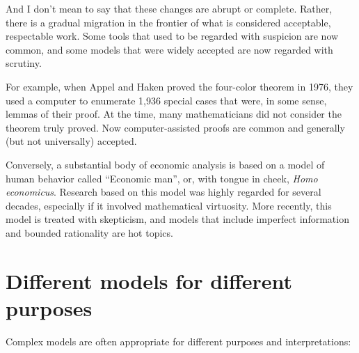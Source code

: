 \documentclass[12pt]{book}
\theoremstyle{exercise}
\begin{document}
And I don't mean to say that these changes are abrupt or complete.
Rather, there is a gradual migration in the frontier of what is
considered acceptable, respectable work.  Some tools that used to be
regarded with suspicion are now common, and some models that were
widely accepted are now regarded with scrutiny.

For example, when Appel and Haken proved the four-color theorem in
1976, they used a computer to enumerate 1,936 special cases that were,
in some sense, lemmas of their proof.  At the time, many
mathematicians did not consider the theorem truly proved.  Now
computer-assisted proofs are common and generally (but not
universally) accepted.


Conversely, a substantial body of economic analysis is based on a
model of human behavior called ``Economic man'', or, with tongue in
cheek, {\it Homo economicus}.  Research based on this model was
highly regarded for several decades, especially if it involved
mathematical virtuosity.  More recently, this model is treated with
skepticism, and models that include imperfect information and
bounded rationality are hot topics.



\section{Different models for different purposes}

Complex models are often appropriate for different purposes and
interpretations:

\end{document}
